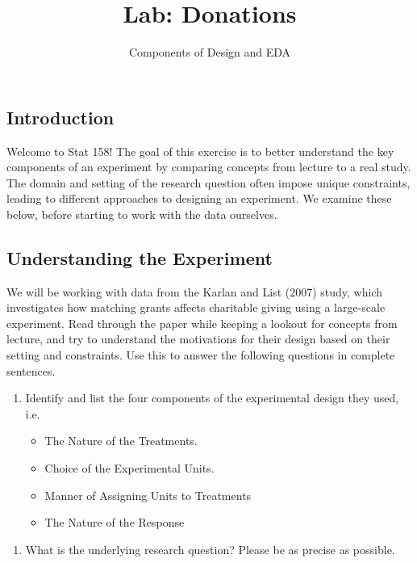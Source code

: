 \documentclass[
  letterpaper,
  DIV=11,
  numbers=noendperiod]{scrartcl}
\title{Lab: Donations}
\subtitle{Components of Design and EDA}
\author{}
\date{}
\providecommand{\tightlist}{%
  \setlength{\itemsep}{0pt}\setlength{\parskip}{0pt}}
\begin{document}
\maketitle


\subsection{Introduction}\label{introduction}

Welcome to Stat 158! The goal of this exercise is to better understand
the key components of an experiment by comparing concepts from lecture
to a real study. The domain and setting of the research question often
impose unique constraints, leading to different approaches to designing
an experiment. We examine these below, before starting to work with the
data ourselves.

\subsection{Understanding the
Experiment}\label{understanding-the-experiment}

We will be working with data from the Karlan and List (2007) study,
which investigates how matching grants affects charitable giving using a
large-scale experiment. Read through the paper while keeping a lookout
for concepts from lecture, and try to understand the motivations for
their design based on their setting and constraints. Use this to answer
the following questions in complete sentences.

\begin{enumerate}
\def\labelenumi{\arabic{enumi}.}
\item
  Identify and list the four components of the experimental design they
  used, i.e.

  \begin{itemize}
  \item
    The Nature of the Treatments.
  \item
    Choice of the Experimental Units.
  \item
    Manner of Assigning Units to Treatments
  \item
    The Nature of the Response
  \end{itemize}
\end{enumerate}

\hfill\break
\hfill\break
\hfill\break
\hfill\break
\hfill\break
\hfill\break
\hfill\break
\hfill\break
\hfill\break
\hfill\break

\begin{enumerate}
\def\labelenumi{\arabic{enumi}.}
\setcounter{enumi}{1}
\tightlist
\item
  What is the underlying research question? Please be as precise as
  possible.\\
\end{enumerate}
\end{document}
